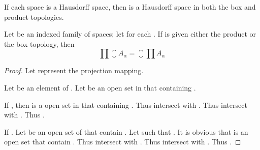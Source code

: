 \begin{theorem}\omitObviuos
      If each space  is a Hausdorff space, then  is a Hausdorff space in both the box and product topologies.
\end{theorem}

\begin{theorem}
      Let  be an indexed family of spaces; let  for each \mt{\alpha}. If  is given either the product or the box topology, then
      \begin{equation*}
            \prod \closure{A_{\alpha}} = \closure{\prod A_{\alpha}}
      \end{equation*}
\end{theorem}

\begin{proof}
      Let \mt{\pi_{\alpha}} represent the projection mapping.

      Let  be an element of . Let  be an open set in  that containing .

      If , then  is a open set in  that containing . Thus  intersect with . Thus  intersect with . Thus .

      If . Let  be an open set of  that contain . Let  such that . It is obvious that  is an open set that contain . Thus  intersect with . Thus  intersect with . Thus .
\end{proof}

